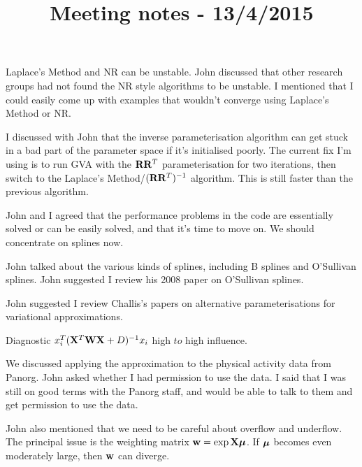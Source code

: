 \documentclass{article}[12pt]
\title{Meeting notes - 13/4/2015}
\begin{document}
Laplace's Method and NR can be unstable. John discussed that other research
groups had not found the NR style algorithms to be unstable. I mentioned that I
could easily come up with examples that wouldn't converge using Laplace's Method
or NR.

I discussed with John that the inverse parameterisation algorithm can get stuck
in a bad part of the parameter space if it's initialised poorly. The current fix
I'm using is to run GVA with the ${\bf R} {\bf R}^T$ parameterisation for two
iterations, then switch to the Laplace's Method/$({\bf R} {\bf R}^T)^{-1}$ algorithm.
This is still faster than the previous algorithm.

John and I agreed that the performance problems in the code are essentially
solved or can be easily solved, and that it's time to move on. We should
concentrate on splines now.

John talked about the various kinds of splines, including B splines and
O'Sullivan splines. John suggested I review his 2008 paper on O'Sullivan
splines.

John suggested I review Challis's papers on alternative parameterisations
for variational approximations.

Diagnostic $x_i^T ({\bf X}^T {\bf W} {\bf X} + D)^{-1} x_i$ high $to$ high influence.

We discussed applying the approximation to the physical activity data
from Panorg. John asked whether I had permission to use the data. I said
that I was still on good terms with the Panorg staff, and would be able to
talk to them and get permission to use the data.

John also mentioned that we need to be careful about overflow and underflow.
The principal issue is the weighting matrix ${\bf w} = \exp{{\bf X}{\boldsymbol\mu}}$. If ${\boldsymbol \mu}$
becomes even moderately large, then ${\bf w}$ can diverge.
\end{document}
